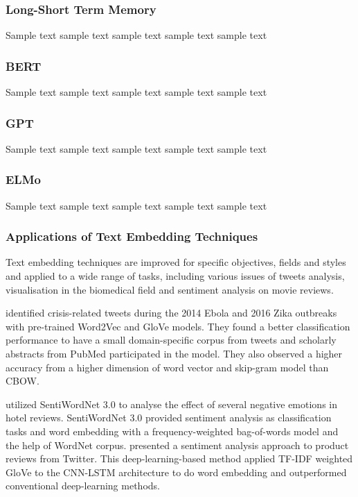 \subsubsection{Long-Short Term Memory}
Sample text sample text sample text sample text sample text

\subsubsection{BERT}
Sample text sample text sample text sample text sample text

\subsubsection{GPT}
Sample text sample text sample text sample text sample text

\subsubsection{ELMo}
Sample text sample text sample text sample text sample text

\subsubsection{Applications of Text Embedding Techniques}
Text embedding techniques are improved for specific objectives, fields and styles and applied to a wide range of tasks, including various issues of tweets analysis\cite{mottaghinia2021}, visualisation in the biomedical field\cite{oubenali2022} and sentiment analysis on movie reviews\cite{sivakumar2021}.

\cite{khatua2019} identified crisis-related tweets during the 2014 Ebola and 2016 Zika outbreaks with pre-trained Word2Vec and GloVe models.
They found a better classification performance to have a small domain-specific corpus from tweets and scholarly abstracts from PubMed participated in the model.
They also observed a higher accuracy from a higher dimension of word vector and skip-gram model than CBOW.

\cite{lee2017} utilized SentiWordNet 3.0 to analyse the effect of several negative emotions in hotel reviews.
SentiWordNet 3.0\cite{baccianella2010} provided sentiment analysis as classification tasks and word embedding with a frequency-weighted bag-of-words model and the help of WordNet corpus.
\cite{onan2021} presented a sentiment analysis approach to product reviews from Twitter.
This deep-learning-based method applied TF-IDF weighted GloVe to the CNN-LSTM architecture to do word embedding and outperformed conventional deep-learning methods.


